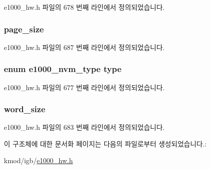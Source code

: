 e1000\+\_\+hw.\+h 파일의 678 번째 라인에서 정의되었습니다.

\subsubsection[{\texorpdfstring{page\+\_\+size}{page_size}}]{ page\+\_\+size}\hypertarget{structe1000__nvm__info_a34d2a526ef0e03267a60568ead677ab5}{}\label{structe1000__nvm__info_a34d2a526ef0e03267a60568ead677ab5}


e1000\+\_\+hw.\+h 파일의 687 번째 라인에서 정의되었습니다.

\subsubsection[{\texorpdfstring{type}{type}}]{\setlength{\rightskip}{0pt plus 5cm}enum {\bf e1000\+\_\+nvm\+\_\+type} type}\hypertarget{structe1000__nvm__info_aed407b4a0d2f26f9223d7bfa7bb2ad5b}{}\label{structe1000__nvm__info_aed407b4a0d2f26f9223d7bfa7bb2ad5b}


e1000\+\_\+hw.\+h 파일의 677 번째 라인에서 정의되었습니다.

\subsubsection[{\texorpdfstring{word\+\_\+size}{word_size}}]{ word\+\_\+size}\hypertarget{structe1000__nvm__info_af882c5e0880f3f4119b0aef0f7aa9357}{}\label{structe1000__nvm__info_af882c5e0880f3f4119b0aef0f7aa9357}


e1000\+\_\+hw.\+h 파일의 683 번째 라인에서 정의되었습니다.



이 구조체에 대한 문서화 페이지는 다음의 파일로부터 생성되었습니다.\+:\begin{DoxyCompactItemize}
\item 
kmod/igb/\hyperlink{kmod_2igb_2e1000__hw_8h}{e1000\+\_\+hw.\+h}\end{DoxyCompactItemize}
